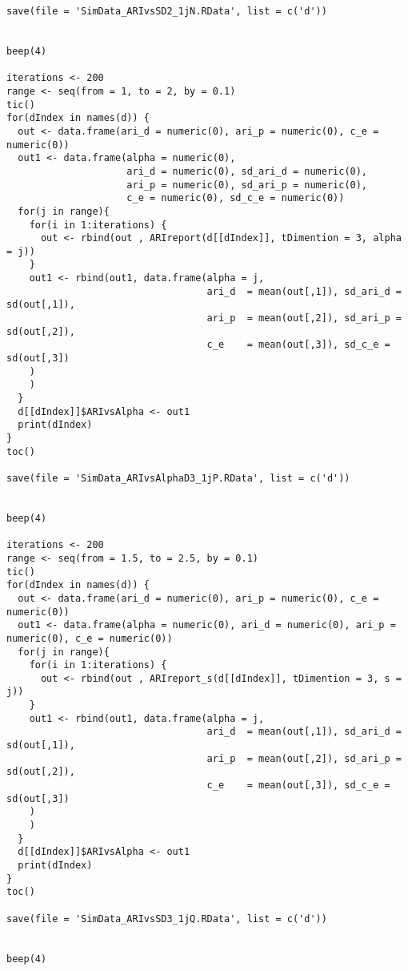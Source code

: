 \begin{latin}
\begin{Verbatim}[breaklines=true, breakanywhere=true, baselinestretch=1]
save(file = 'SimData_ARIvsSD2_1jN.RData', list = c('d'))


beep(4)

iterations <- 200
range <- seq(from = 1, to = 2, by = 0.1)
tic()
for(dIndex in names(d)) {
  out <- data.frame(ari_d = numeric(0), ari_p = numeric(0), c_e = numeric(0))
  out1 <- data.frame(alpha = numeric(0),
                     ari_d = numeric(0), sd_ari_d = numeric(0),
                     ari_p = numeric(0), sd_ari_p = numeric(0),
                     c_e = numeric(0), sd_c_e = numeric(0))
  for(j in range){
    for(i in 1:iterations) {
      out <- rbind(out , ARIreport(d[[dIndex]], tDimention = 3, alpha = j))
    }
    out1 <- rbind(out1, data.frame(alpha = j,
                                   ari_d  = mean(out[,1]), sd_ari_d = sd(out[,1]),
                                   ari_p  = mean(out[,2]), sd_ari_p = sd(out[,2]),
                                   c_e    = mean(out[,3]), sd_c_e = sd(out[,3])
    )
    )
  }
  d[[dIndex]]$ARIvsAlpha <- out1
  print(dIndex)
}
toc()

save(file = 'SimData_ARIvsAlphaD3_1jP.RData', list = c('d'))


beep(4)

iterations <- 200
range <- seq(from = 1.5, to = 2.5, by = 0.1)
tic()
for(dIndex in names(d)) {
  out <- data.frame(ari_d = numeric(0), ari_p = numeric(0), c_e = numeric(0))
  out1 <- data.frame(alpha = numeric(0), ari_d = numeric(0), ari_p = numeric(0), c_e = numeric(0))
  for(j in range){
    for(i in 1:iterations) {
      out <- rbind(out , ARIreport_s(d[[dIndex]], tDimention = 3, s = j))
    }
    out1 <- rbind(out1, data.frame(alpha = j,
                                   ari_d  = mean(out[,1]), sd_ari_d = sd(out[,1]),
                                   ari_p  = mean(out[,2]), sd_ari_p = sd(out[,2]),
                                   c_e    = mean(out[,3]), sd_c_e = sd(out[,3])
    )
    )
  }
  d[[dIndex]]$ARIvsAlpha <- out1
  print(dIndex)
}
toc()

save(file = 'SimData_ARIvsSD3_1jQ.RData', list = c('d'))


beep(4)


\end{Verbatim}
\end{latin}
